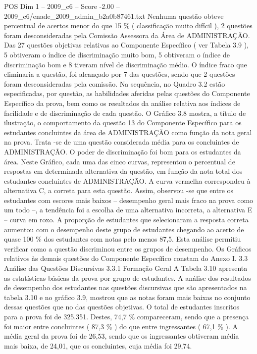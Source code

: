 \begin{textsample}{POS Dim 1 – 2009\_c6 – Score -2.00 – 2009\_c6/enade\_2009\_admin\_b2a0b87461.txt}
Nenhuma questão obteve percentual de acertos menor do que 15 \% ( classificação muito difícil ), 2 questões foram desconsideradas pela Comissão Assessora da Área de ADMINISTRAÇÃO.
Das 27 questões objetivas relativas ao Componente Específico ( ver Tabela 3.9 ), 5 obtiveram o índice de discriminação muito bom, 5 obtiveram o índice de discriminação bom e 8 tiveram nível de discriminação médio.
O índice fraco que eliminaria a questão, foi alcançado por 7 das questões, sendo que 2 questões foram desconsideradas pela comissão.
Na sequência, no Quadro 3.2 estão especificadas, por questão, as habilidades aferidas pelas questões do Componente Específico da prova, bem como os resultados da análise relativa aos índices de facilidade e de discriminação de cada questão.
O Gráfico 3.8 mostra, a título de ilustração, o comportamento da questão 13 do Componente Específico para os estudantes concluintes da área de ADMINISTRAÇÃO como função da nota geral na prova.
Trata -se de uma questão considerada média para os concluintes de ADMINISTRAÇÃO.
O poder de discriminação foi bom para os estudantes da área.
Neste Gráfico, cada uma das cinco curvas, representou o percentual de respostas em determinada alternativa da questão, em função da nota total dos estudantes concluintes de ADMINISTRAÇÃO.
A curva vermelha correspondeu à alternativa C, a correta para esta questão.
Assim, observou -se que entre os estudantes com escores mais baixos – desempenho geral mais fraco na prova como um todo –, a tendência foi a escolha de uma alternativa incorreta, a alternativa E – curva em roxo.
A proporção de estudantes que selecionaram a resposta correta aumentou com o desempenho deste grupo de estudantes chegando ao acerto de quase 100 \% dos estudantes com notas pelo menos 87,5.
Esta análise permitiu verificar como a questão discriminou entre os grupos de desempenho.
Os Gráficos relativos às demais questões do Componente Específico constam do Anexo I. 3.3 Análise das Questões Discursivas 3.3.1 Formação Geral A Tabela 3.10 apresenta as estatísticas básicas da prova por grupo de estudantes.
A análise dos resultados de desempenho dos estudantes nas questões discursivas que são apresentados na tabela 3.10 e no gráfico 3.9, mostrou que as notas foram mais baixas no conjunto dessas questões que no das questões objetivas.
O total de estudantes inscritos para a prova foi de 325.351.
Destes, 74,7 \% compareceram, sendo que a presença foi maior entre concluintes ( 87,3 \% ) do que entre ingressantes ( 67,1 \% ).
A média geral da prova foi de 26,53, sendo que os ingressantes obtiveram média mais baixa, de 24,01, que os concluintes, cuja média foi 29,74.

\end{textsample}
